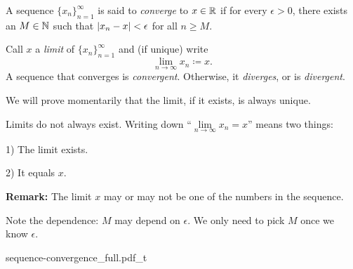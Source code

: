 \documentclass[10pt,aspectratio=149]{beamer}
\begin{document}
\begin{frame}
\begin{definition}
A sequence $\{ x_n \}_{n=1}^\infty$ is said to \emph{converge} to
$x \in {\mathbb{R}}$ if for every $\epsilon > 0$, there exists an $M \in {\mathbb{N}}$ such
that $\left\lvert {x_n - x} \right\rvert < \epsilon$ for all $n \geq M$.
\pause

Call $x$ a \emph{limit} of $\{ x_n \}_{n=1}^\infty$ and (if unique) write
\begin{equation*}
\lim_{n\to \infty} x_n \coloneqq x .
\end{equation*}
\pause
A sequence
that converges is \emph{convergent}.
Otherwise, it \emph{diverges}, or is \emph{divergent}.
\end{definition}

\pause

We will prove momentarily that the limit,
if it exists, is always unique.

\pause
\medskip

Limits do not always exist.
\pause
Writing down ``$\lim\limits_{n\to\infty} x_n = x$'' means two things:

1) The limit exists.

2) It equals $x$.

\pause
\medskip

\textbf{Remark:}
The limit $x$ may or may not be one of the numbers in the sequence.

\pause
\medskip

Note the dependence: $M$ may depend on $\epsilon$.  We only need to pick $M$
once we know $\epsilon$.
\end{frame}

\begin{frame}
\centering
{sequence-convergence_full.pdf_t}
\end{frame}
\end{document}
